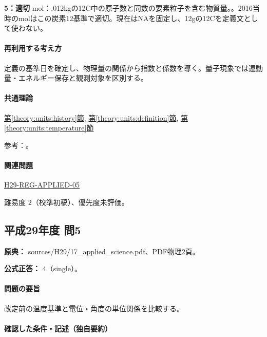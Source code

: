 \noindent\textbf{5：適切} mol：.012kgの12C中の原子数と同数の要素粒子を含む物質量。。2016当時のmolはこの炭素12基準で適切。現在はNAを固定し、12gの12Cを定義文として使わない。\par

\paragraph{再利用する考え方} 定義の基準日を確定し、物理量の関係から指数と係数を導く。量子現象では運動量・エネルギー保存と観測対象を区別する。

\paragraph{共通理論} \hyperref[theory:units:history]{第\ref*{theory:units:history}節}, \hyperref[theory:units:definition]{第\ref*{theory:units:definition}節}, \hyperref[theory:units:temperature]{第\ref*{theory:units:temperature}節}

\par 参考：\cite{si_nist811,si_kelvin2007,si_cgpm2018}。

\paragraph{関連問題} \hyperref[q:h29-reg-applied-05]{H29-REG-APPLIED-05}

\par 難易度 2（校準初稿）、優先度未評価。

\subsection{平成29年度 問5}
\label{q:h29-reg-applied-05}

\noindent\textbf{原典：} sources/H29/17\_applied\_science.pdf、PDF物理2頁。

\textbf{公式正答：} 4（single）。

\paragraph{問題の要旨} 改定前の温度基準と電位・角度の単位関係を比較する。

\paragraph{確認した条件・記述（独自要約）}\mbox{}\par

